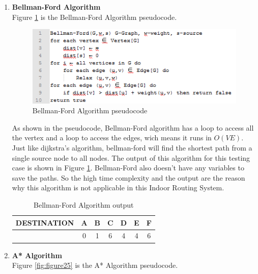 \begin{enumerate}
	\item \textbf{Bellman-Ford Algorithm}\\
	Figure \ref{fig:figure24} is the Bellman-Ford Algorithm pseudocode.
	
	\begin{figure}[h!]
		\centering
		\includegraphics[scale=1]{figure8.PNG}
		\caption{Bellman-Ford Algorithm pseudocode
		}
		\label{fig:figure24}
	\end{figure}
	
	As shown in the pseudocode, Bellman-Ford algorithm has a loop to access all the vertex and a loop to access the edges, wich means it runs in \textbf{$O(VE)$}. Just like dijkstra's algorithm, bellman-ford will find the shortest path from a single source node to all nodes. The output of this algorithm for this testing case is shown in Figure \ref{table:7}. Bellman-Ford also doesn't have any variables to save the paths. So the high time complexity and the output are the reason why this algorithm is not applicable in this Indoor Routing System.
	
	\begin{table}[h!]
		\centering
		\caption{Bellman-Ford Algorithm output}
		\label{table:7}
		\begin{tabular}{|c|c|c|c|c|c|c|}
			\hline
			\rowcolor[HTML]{F8FF00} 
			\textbf{DESTINATION} & \textbf{A} & \textbf{B} & \textbf{C} & \textbf{D} & \textbf{E} & \textbf{F} \\ \hline
			& 0          & 1          & 6          & 4          & 4          & 6          \\ \hline
		\end{tabular}
	\end{table}
	
	\item \textbf{A* Algorithm}\\
	Figure \ref{fig:figure25} is the A* Algorithm pseudocode.
	

\end{enumerate}
